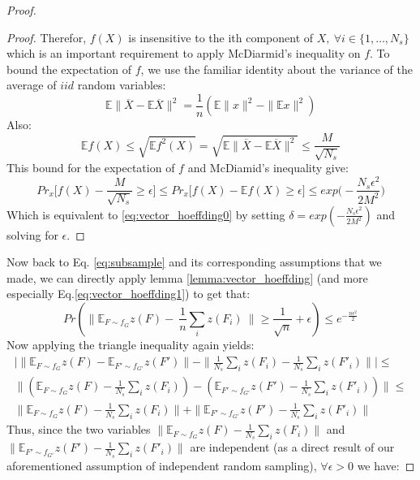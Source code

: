 \begin{proof}
\begin{proof}
Therefor, $f(X)$ is insensitive to the ith component of $X,~ \forall i \in \{1,\ldots,{N_s}\}$ which is an important requirement to apply McDiarmid's inequality on $f$. \newline
To bound the expectation of $f$, we use the familiar identity about the variance of the average of $iid$ random variables:
\begin{equation}
\mathbb{E}\|\overline{X}-\mathbb{E}\overline{X}\|^2=\frac{1}{n}(\mathbb{E}\|x\|^2-\|\mathbb{E}x\|^2 ) 
\end{equation}
Also:
\[ \mathbb{E}f(X)\leq\sqrt{\mathbb{E}f^2(X)}=\sqrt{\mathbb{E}\|\overline{X}-\mathbb{E}\overline{X}\|^2}\leq \frac{M}{\sqrt{{N_s}}}\]
This bound for the expectation of $f$ and McDiamid's inequality give: 
\begin{equation}
\label{eq:vector_hoeffding1}
    Pr_x \Big [ f(X)-\frac{M}{\sqrt{{N_s}}}\geq \epsilon \Big ]\leq
    Pr_x \Big [ f(X)-\mathbb{E}f(X)\geq \epsilon \Big ]\leq
    exp\Big( -\frac{{N_s}\epsilon^2}{2M^2}\Big)
\end{equation}
Which is equivalent to \eqref{eq:vector_hoeffding0} by setting $\delta=exp( -\frac{{N_s}\epsilon^2}{2M^2})$ and solving for $\epsilon$.
\end{proof}
Now back to Eq. \eqref{eq:subsample} and its corresponding assumptions that we made, we can directly apply lemma \ref{lemma:vector_hoeffding} (and more especially Eq.\eqref{eq:vector_hoeffding1}) to get that:
\begin{equation}
    \label{eq:fixed_w}
    Pr(\|\mathbb{E}_{F \sim f_G} z(F)-~\frac{1}{n} \sum_i z(F_i)~\|\geq \frac{1}{\sqrt{n}}+\epsilon)\leq
    e^{-\frac{n\epsilon^2}{2}}
\end{equation}
Now applying the triangle inequality again yields:
\begin{align*}
    \Big | \| \mathbb{E}_{F \sim f_G} z(F) - \mathbb{E}_{F' \sim f_{G'}} z(F')\| - \| \frac{1}{{N_s}} \sum_i z(F_i) - \frac{1}{{N_s}} \sum_i z(F'_i)\|\Big | \leq  \\
   \| (\mathbb{E}_{F \sim f_G} z(F) -  \frac{1}{{N_s}} \sum_i z(F_i) )- (\mathbb{E}_{F' \sim f_{G'}} z(F') - \frac{1}{{N_s}} \sum_i z(F'_i))\|\leq \\
    \| \mathbb{E}_{F \sim f_G} z(F) -  \frac{1}{{N_s}} \sum_i z(F_i) \|+ \|\mathbb{E}_{F' \sim f_{G'}} z(F') - \frac{1}{{N_s}} \sum_i z(F'_i)\|
\end{align*}
Thus, since the two variables $\| \mathbb{E}_{F \sim f_G} z(F) -  \frac{1}{{N_s}} \sum_i z(F_i) \|$ and $\|\mathbb{E}_{F' \sim f_{G'}} z(F') - \frac{1}{{N_s}} \sum_i z(F'_i)\|$ are independent (as a direct result of our aforementioned assumption of independent random sampling), $\forall \epsilon>0$ we have:

\end{proof}
